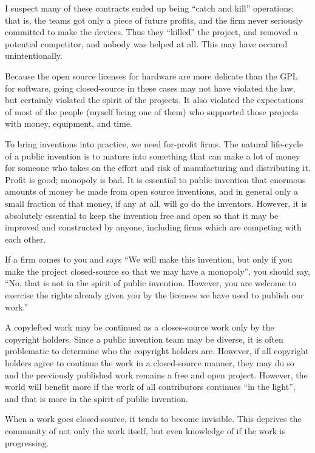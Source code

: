\documentclass[
	fontsize=10pt, %
	twoside=false, %
	secnumdepth=1, %
]{kaobook}
\begin{document}
I suspect many of these contracts ended
up being ``catch and kill'' operations; that is,
the teams got only a piece of future profits, and
the firm never seriously committed to make the devices.
Thus they ``killed'' the project, and removed a potential
competitor, and nobody was helped at all.
This may have occured unintentionally.

Because the open source licenses for hardware are
more delicate than the GPL for software, going
closed-source in these cases may not have violated
the law, but certainly violated the spirit of the
projects.
It also violated the expectations of most
of the people (myself being one of them)
who supported those projects with money,
equipment, and time.

To bring inventions into practice, we need
for-profit firms. The natural life-cycle
of a public invention is to mature into
something that can make a lot of money
for someone who takes on the effort and
risk of manufacturing and distributing it.
Profit is good; monopoly is bad.
It is essential to public invention that
enormous amounts of money be made from open source inventions,
and in general only a small fraction of that money,
if any at all, will go do the inventors.
However, it is absolutely essential to keep the invention
free and open so that it may be improved
and constructed by anyone, including firms
which are competing with each other.

If a firm comes to you and says
``We will make this invention, but only
if you make the project closed-source so
that we may have a monopoly'', you should
say, ``No, that is not in the spirit of public invention.
However, you are welcome to exercise the rights
already given you by the licenses we have used to
publish our work.''

A copylefted work may be continued as a
closes-source work only by the copyright holders.
Since a public invention team may be diverse,
it is often problematic to determine who the copyright holders are.
However, if all copyright
holders agree to continue the work in a closed-source
manner, they may do so and the previously published
work remains a free and open project.
However, the world will benefit more if the
work of all contributors continues ``in the light'', and that
is more in the spirit of public invention.

When a work goes closed-source, it tends
to become invisible.
This deprives the community of not
only the work itself, but even knowledge of if the work is
progressing.
\end{document}
